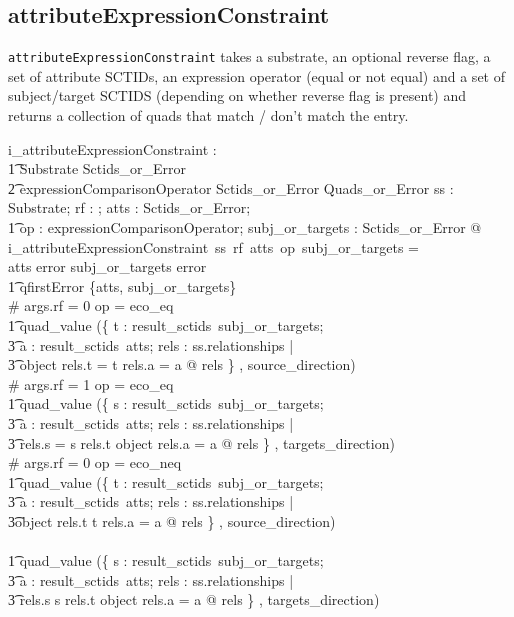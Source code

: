 \documentclass{article}
\def\spec#1{{\tt #1}}
\begin{document}
\subsection{attributeExpressionConstraint}
\spec{attributeExpressionConstraint} takes a substrate, an optional reverse flag, a set of attribute SCTIDs, an expression operator (equal or not equal) and a set of subject/target SCTIDS (depending on 
whether reverse flag is present) and returns a collection of quads that match / don't match the entry.
\begin{gendef}
   i\_attributeExpressionConstraint : \\ 
\t1 Substrate \fun \optional[reverseFlag] \fun Sctids\_or\_Error \fun \\
\t2 expressionComparisonOperator \fun Sctids\_or\_Error \fun Quads\_or\_Error
\where
   \forall ss : Substrate;  rf : \optional[reverseFlag]; atts : Sctids\_or\_Error; \\
\t1 op : expressionComparisonOperator; subj\_or\_targets : Sctids\_or\_Error @ \\
   i\_attributeExpressionConstraint~ss~rf~atts~op~subj\_or\_targets = \\
 \IF atts \in \ran error \lor subj\_or\_targets \in \ran error \\
\t1 \THEN qfirstError \{atts, subj\_or\_targets\} \\
 \ELSE \IF \# args.rf = 0 \land op = eco\_eq \THEN \\
\t1 quad\_value (\{ t : result\_sctids~subj\_or\_targets; \\
\t3 a : result\_sctids~atts; rels : ss.relationships | \\
\t3 object \inv rels.t = t \land rels.a = a @ rels \} , source\_direction) \\
\ELSE \IF \# args.rf = 1 \land op = eco\_eq \THEN \\
\t1 quad\_value (\{ s : result\_sctids~subj\_or\_targets; \\
\t3 a : result\_sctids~atts; rels : ss.relationships | \\
\t3 rels.s = s \land rels.t \in \ran object \land rels.a = a @ rels \} , targets\_direction) \\
 \ELSE \IF \# args.rf = 0 \land op = eco\_neq \THEN \\
\t1 quad\_value (\{ t : result\_sctids~subj\_or\_targets; \\
\t3 a : result\_sctids~atts; rels : ss.relationships | \\
\t3object \inv rels.t \neq t \land rels.a = a @ rels \} , source\_direction) \\
 \ELSE \\
\t1 quad\_value (\{ s : result\_sctids~subj\_or\_targets; \\
\t3 a : result\_sctids~atts; rels : ss.relationships | \\
\t3 rels.s \neq s \land rels.t \in \ran object \land rels.a = a @ rels \} , targets\_direction) 
\end{gendef}
\end{document}
